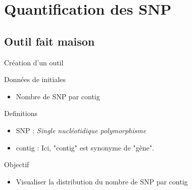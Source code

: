 \section{Quantification des SNP}
\begin{frame}
	\tableofcontents[sectionstyle=show/shaded,subsectionstyle=show/show/hide,subsubsectionstyle=show/show/hide]
\end{frame}

\subsection{Outil fait maison}
\begin{frame}{Création d'un outil}
    \begin{block}{Données de initiales}
        \begin{itemize}
            \item Nombre de SNP par contig
        \end{itemize}
    \end{block}

    \begin{block}{Definitions}
        \begin{itemize}
            \item SNP : \textit{Single nucléotidique polymorphisme}
            \item contig : Ici, "contig" est synonyme de "gène".
        \end{itemize}
    \end{block}

    \pause

    \begin{alertblock}{Objectif}
        \begin{itemize}
            \item Visualiser la distribution du nombre de SNP par contig
        \end{itemize}
    \end{alertblock}

\end{frame}

